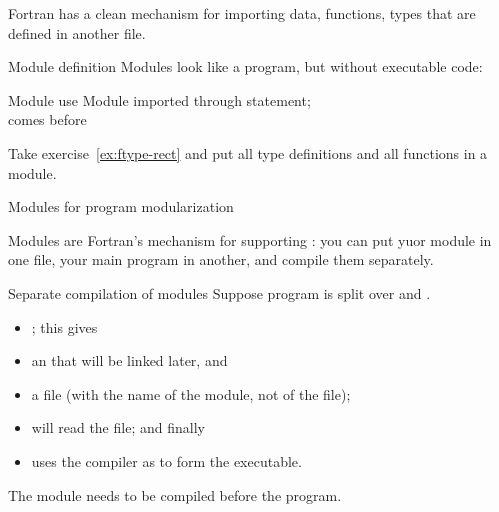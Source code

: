 
Fortran has a clean mechanism for importing data, functions, types
that are defined in another file.

\begin{block}{Module definition}
  \label{sl:fmod-def}
  Modules look like a program, but without executable code:
\end{block}

\begin{block}{Module use}
  \label{sl:fmod-use}
  Module imported through  statement;\\
  comes before 
\end{block}

\begin{exercise}
  \label{ex:fmod-rect}
  Take exercise~\ref{ex:ftype-rect} and put all type definitions and
  all functions in a module.
\end{exercise}

 {Modules for program modularization}

Modules are Fortran's mechanism for supporting
: you can put yuor module in one
file, your main program in another, and compile them separately.

\begin{block}{Separate compilation of modules}
  \label{sl:fcompile-mods}
  Suppose program is split over  and .
  \begin{itemize}
  \item {}; this gives
  \item an  that will be linked later, and
  \item a  file (with the name of the module, not of the
    file);
  \item {} will read the  file; and finally
  \item {} uses the
    compiler as  to form the executable.
  \end{itemize}
  The module needs to be compiled before the program.
\end{block}

